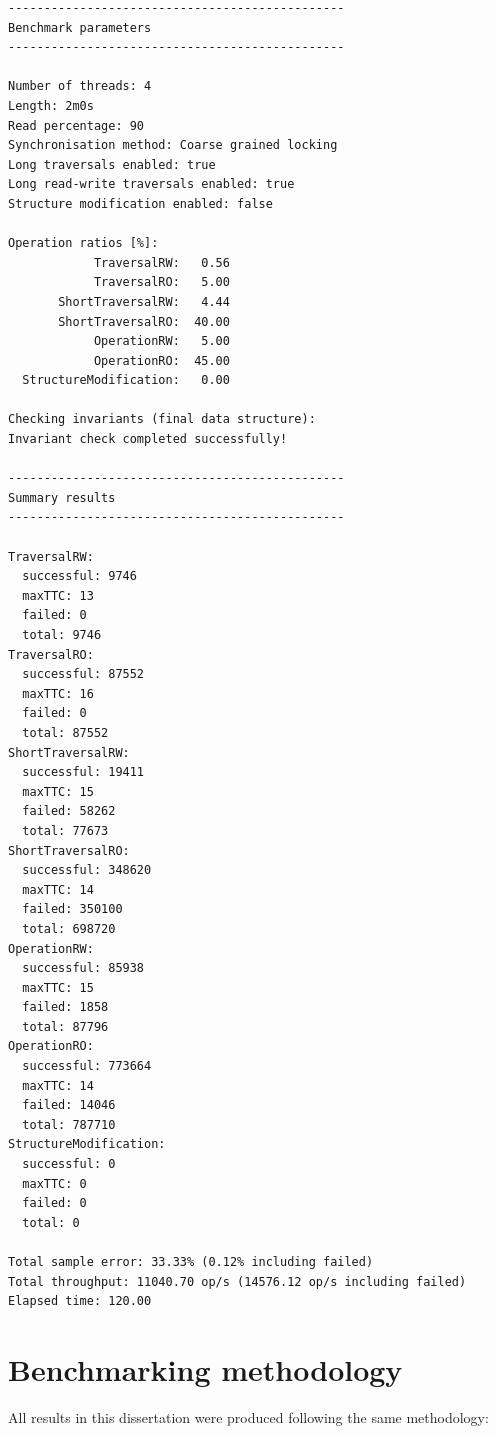\documentclass[12pt,a4paper,oneside,openright]{report}
\begin{document}
\begin{lstlisting}
-----------------------------------------------
Benchmark parameters
-----------------------------------------------

Number of threads: 4
Length: 2m0s
Read percentage: 90
Synchronisation method: Coarse grained locking
Long traversals enabled: true
Long read-write traversals enabled: true
Structure modification enabled: false

Operation ratios [%]:
            TraversalRW:   0.56
            TraversalRO:   5.00
       ShortTraversalRW:   4.44
       ShortTraversalRO:  40.00
            OperationRW:   5.00
            OperationRO:  45.00
  StructureModification:   0.00

Checking invariants (final data structure):
Invariant check completed successfully!

-----------------------------------------------
Summary results
-----------------------------------------------

TraversalRW:
  successful: 9746
  maxTTC: 13
  failed: 0
  total: 9746
TraversalRO:
  successful: 87552
  maxTTC: 16
  failed: 0
  total: 87552
ShortTraversalRW:
  successful: 19411
  maxTTC: 15
  failed: 58262
  total: 77673
ShortTraversalRO:
  successful: 348620
  maxTTC: 14
  failed: 350100
  total: 698720
OperationRW:
  successful: 85938
  maxTTC: 15
  failed: 1858
  total: 87796
OperationRO:
  successful: 773664
  maxTTC: 14
  failed: 14046
  total: 787710
StructureModification:
  successful: 0
  maxTTC: 0
  failed: 0
  total: 0

Total sample error: 33.33% (0.12% including failed)
Total throughput: 11040.70 op/s (14576.12 op/s including failed)
Elapsed time: 120.00
\end{lstlisting}

\chapter{Benchmarking methodology}
\label{cha:benchm-meth}

All results in this dissertation were produced following the same
methodology:
\end{document}
